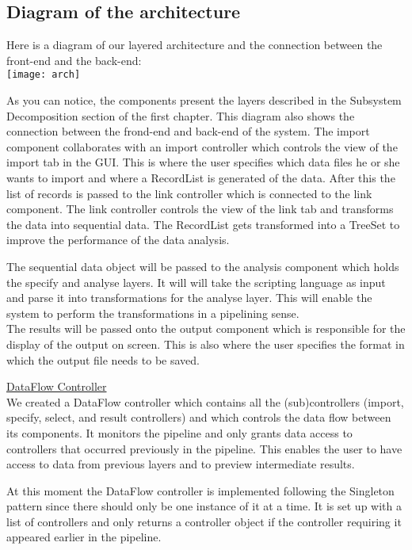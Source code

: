 \documentclass[a4paper,english,fleqn]{exam}
\begin{document}
\subsection{Diagram of the architecture}

Here is a diagram of our layered architecture and the connection between the front-end and the back-end: \\

\texttt{[image: arch]}

As you can notice, the components present the layers described in the Subsystem Decomposition section of the first chapter. This diagram also shows the connection between the frond-end and back-end of the system. The import component collaborates with an import controller which controls the view of the import tab in the GUI. This is where the user specifies which data files he or she wants to import and where a RecordList is generated of the data. After this the list of records is passed to the link controller which is connected to the link component. The link controller controls the view of the link tab and transforms the data into sequential data. The RecordList gets transformed into a TreeSet to improve the performance of the data analysis. 

The sequential data object will be passed to the analysis component which holds the specify and analyse layers. It will will take the scripting language as input and parse it into transformations for the analyse layer. This will enable the system to perform the transformations in a pipelining sense. \\

The results will be passed onto the output component which is responsible for the display of the output on screen.  This is also where the user specifies the format in which the output file needs to be saved. 

\underline{DataFlow Controller} \\
We created a DataFlow controller which contains all the (sub)controllers (import, specify, select, and result controllers) and which controls the data flow between its components. It monitors the pipeline and only grants data access to controllers that occurred previously in the pipeline. This enables the user to have access to data from previous layers and to preview intermediate results. 

At this moment the DataFlow controller is implemented following the Singleton pattern since there should only be one instance of it at a time. It is set up with a list of controllers and only returns a controller object if the controller requiring it appeared earlier in the pipeline. 
\end{document}
